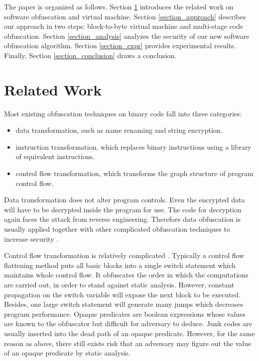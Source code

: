 \documentclass{../style/llncs}                   %
\begin{document}
The paper is organized as follows.
Section \ref{section_sw_obfuscation} introduces the related work on
software obfuscation and virtual machine.
Section \ref{section_approach} describes our approach in two steps:
block-to-byte virtual machine and multi-stage code obfuscation.
Section \ref{section_analysis} analyzes the security of our new
software obfuscation algorithm.
Section \ref{section_expr} provides experimental results.
Finally, Section \ref{section_conclusion} draws a conclusion.




\section{Related Work} \label{section_sw_obfuscation}


Most existing obfuscation techniques on binary code fall into three categories:
\begin{itemize}
  \item data transformation, such as name renaming and string encryption.
  \item instruction transformation, which replaces binary instructions using a
  library of equivalent instructions.
  \item control flow transformation, which transforms the graph structure of program control flow.
\end{itemize}

Data transformation does not alter program controls. Even the encrypted data
will have to be decrypted inside the program for use. The code for
decryption again faces the attack from reverse engineering.
Therefore data obfuscation is usually applied together with
other complicated obfuscation techniques to increase security
\cite{monden04,hohenberger07,sivadasan09}.

Control flow transformation is relatively complicated
\cite{wang01,jhala05,ge05,preda06,abadi10}.
Typically a control flow flattening method puts all basic blocks into a single switch
statement which maintains whole control flow.
It obfuscates the order
in which the computations are carried out,
in order to stand against static analysis.
However, constant propagation on
the switch variable will expose the next block to be executed.
Besides, one large switch statement will generate many jumps which
decreases program performance.
Opaque predicates are boolean expressions whose values are known to the
obfuscator but difficult for adversary to deduce. Junk codes are usually inserted
into the dead path of an opaque predicate.
However, for the same reason as above,
there still exists risk that an adversary may figure out the value of an
opaque predicate by static analysis.
\end{document}

